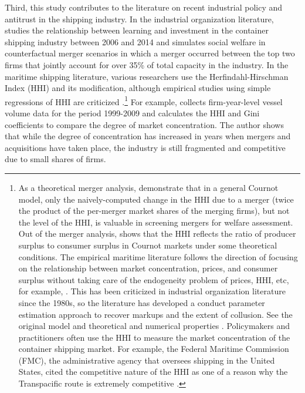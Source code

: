 \documentclass[10pt]{article}
\begin{document}
Third, this study contributes to the literature on recent industrial policy and antitrust in the shipping industry. In the industrial organization literature, \cite{jeon2022learning} studies the relationship between learning and investment in the container shipping industry between 2006 and 2014 and simulates social welfare in counterfactual merger scenarios in which a merger occurred between the top two firms that jointly account for over 35\% of total capacity in the industry.
In the maritime shipping literature, various researchers use the Herfindahl-Hirschman Index (HHI) and its modification, although empirical studies using simple regressions of HHI are criticized \citep{bresnahan1989empirical}.\footnote{As a theoretical merger analysis, \cite{nocke2022concentration} demonstrate that in a general Cournot model, only the naively-computed change in the HHI due to a merger (twice the product of the per-merger market shares of the merging firms), but not the level of the HHI, is valuable in screening mergers for welfare assessment. Out of the merger analysis, \cite{spiegel2021herfindahl} shows that the HHI reflects the ratio of producer surplus to consumer surplus in Cournot markets under some theoretical conditions. The empirical maritime literature follows the direction of \cite{spiegel2021herfindahl} focusing on the relationship between market concentration, prices, and consumer surplus without taking care of the endogeneity problem of prices, HHI, etc, for example, \cite{Hirata2017}. This has been criticized in industrial organization literature \citep{bresnahan1989empirical} since the 1980s, so the literature has developed a conduct parameter estimation approach to recover markups and the extent of collusion. See the original model \citep{bresnahan1982oligopoly} and theoretical and numerical properties \citep{matsumura2024conduct,matsumura2023test,matsumura2023revisiting}. Policymakers and practitioners often use the HHI to measure the market concentration of the container shipping market. For example, the Federal Maritime Commission (FMC), the administrative agency that oversees shipping in the United States, cited the competitive nature of the HHI as one of a reason why the Transpacific route is extremely competitive \citep{FMC2022}.} For example,
\cite{Sys2009TransPOL} collects firm-year-level vessel volume data for the period 1999-2009 and calculates the HHI and Gini coefficients to compare the degree of market concentration. 
The author shows that while the degree of concentration has increased in years when mergers and acquisitions have taken place, the industry is still fragmented and competitive due to small shares of firms.
\end{document}

